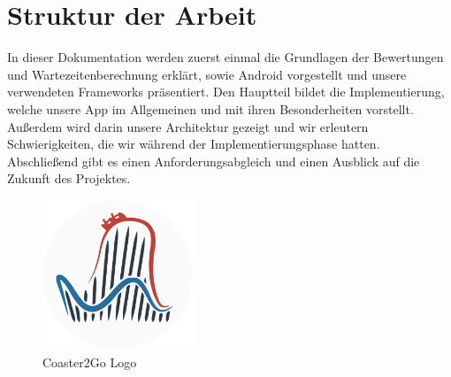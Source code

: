 \section{Struktur der Arbeit}
\label{sec:einleitung:struktur}

In dieser Dokumentation werden zuerst einmal die Grundlagen der Bewertungen und Wartezeitenberechnung erklärt, sowie Android vorgestellt und unsere verwendeten Frameworks präsentiert. Den Hauptteil bildet die Implementierung, welche unsere App im Allgemeinen und mit ihren Besonderheiten vorstellt. Außerdem wird darin unsere Architektur gezeigt und wir erleutern Schwierigkeiten, die wir während der Implementierungsphase hatten. Abschließend gibt es einen Anforderungsabgleich und einen Ausblick auf die Zukunft des Projektes.\\

\begin{figure}[htp]
	\centering
  	\includegraphics[width=0.4\textwidth]{img/coaster42_logo.png}
	\caption{Coaster2Go Logo}
	\label{figure:coaster2gologo}
\end{figure}

